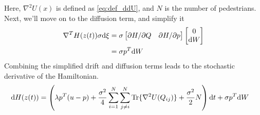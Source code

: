 Here, $\nabla^2U(x)$ is defined as \autoref{eq:def_ddU}, and $N$ is the number of pedestrians. Next, we'll move on to the diffusion term, and simplify it
\begin{gather*}
    \begin{aligned}
        \nabla^T H(z(t))\sigma \mathrm d \xi &= \sigma
        \begin{bmatrix}
            \partial H / \partial Q & \partial H / \partial p
        \end{bmatrix}
        \begin{bmatrix}
            0 \\ \mathrm d W
        \end{bmatrix} \\
        &= \sigma p^T \mathrm d W
    \end{aligned}
\end{gather*}
Combining the simplified drift and diffusion terms leads to the stochastic derivative of the Hamiltonian.
\begin{gather}
    \begin{aligned}
    \mathrm d H(z(t)) &=\left(\lambda p^T(u-p) + \dfrac{\sigma^2}{4}\sum^N_{i=1} \sum^N_{j \neq i }\text{Tr}\{\nabla^2 U(Q_{ij})\} + \dfrac{\sigma^2}{2}N\right)\mathrm d t + \sigma p^T \mathrm d W
    \end{aligned}
    \label{eq:stoch_dH}
\end{gather}